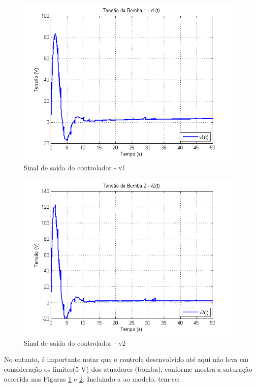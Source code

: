 \begin{figure}[H]
	\centering
	\includegraphics[height=0.35\paperheight ,keepaspectratio]{img/fm_u1_free.png}
	\caption{\small Sinal de saída do controlador - v1 }
	\label{figFm_u1_free}
\end{figure}

\begin{figure}[H]
	\centering
	\includegraphics[height=0.35\paperheight ,keepaspectratio]{img/fm_u2_free.png}
	\caption{Sinal de saída do controlador - v2 }
	\label{figFm_u2_free}
\end{figure}

No entanto, é importante notar que o controle desenvolvido até aqui não leva em consideração os limites(5 V) dos atuadores (bomba), conforme mostra a saturação ocorrida nas Figuras \ref{figFm_u1_free} e \ref{figFm_u2_free}. Incluindo-a ao modelo, tem-se:

